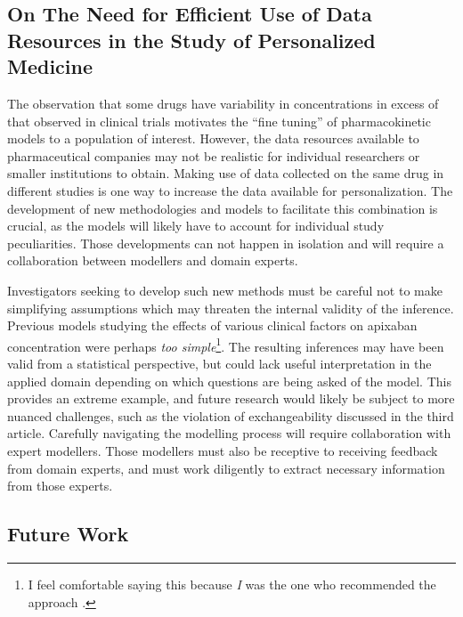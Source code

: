 \subsection{On The Need for Efficient Use of Data Resources in the Study of Personalized Medicine}

The observation that some drugs have variability in concentrations in excess of that observed in clinical trials motivates the ``fine tuning'' of pharmacokinetic models to a population of interest.  However, the data resources available to pharmaceutical companies may not be realistic for individual researchers or smaller institutions to obtain.  Making use of data collected on the same drug in different studies is one way to increase the data available for personalization.  The development of new methodologies and models to facilitate this combination is crucial, as the models will likely have to account for individual study peculiarities. Those developments can not happen in isolation and will require a collaboration between modellers and domain experts.

Investigators seeking to develop such new methods must be careful not to make simplifying assumptions which may threaten the internal validity of the inference. Previous models studying the effects of various clinical factors on apixaban concentration were perhaps \textit{too simple}\footnote{I feel comfortable saying this because \textit{I} was the one who recommended the approach \cite{gulilat_drug_2020}.}.  The resulting inferences may have been valid from a statistical perspective, but could lack useful interpretation in the applied domain depending on which questions are being asked of the model.  This provides an extreme example, and future research would likely be subject to more nuanced challenges, such as the violation of exchangeability discussed in the third article. Carefully navigating the modelling process will require collaboration with expert modellers.  Those modellers must also be receptive to receiving feedback from domain experts, and must work diligently to extract necessary information from those experts.


\subsection{Future Work}

